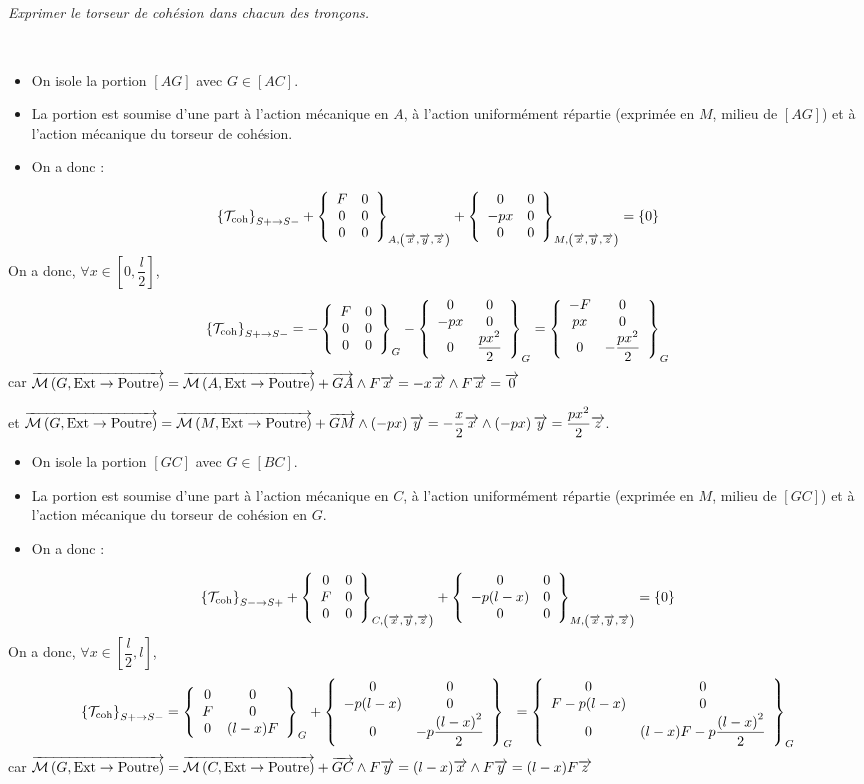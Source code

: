 \documentclass[10pt,fleqn]{article} %
\begin{document}
\begin{multicols}{2}
\subparagraph{}
\textit{Exprimer le torseur de cohésion dans chacun des tronçons.}
\ifprof
\begin{corrige}
~\\
\begin{itemize}[label=,font=\color{ocre}] 
\item On isole la portion $[AG]$ avec $G \in [AC]$.
\item La portion est soumise d'une part à l'action mécanique en $A$, à l'action uniformément répartie (exprimée en $M$, milieu de $[AG]$) et à l'action mécanique du torseur de cohésion.
\item On a donc : 
\end{itemize}
$$
\torseurscoh_{S+\rightarrow S-} +
 \torseurcol{F}{0}{0}{0}{0}{0}{A,\left( \vect{x},\vect{y},\vect{z} \right)} 
 +\torseurcol{0}{-px}{0}{0}{0}{0}{M,\left( \vect{x},\vect{y},\vect{z} \right)} 
 = \{0\}
$$
On a donc, $\forall x \in \left[0,\dfrac{l}{2}\right]$, 
$$
\torseurscoh_{S+\rightarrow S-}
=-\torseurcol{F}{0}{0}{0}{0}{0}{G}
-\torseurcol{0}{-px}{0}{0}{0}{ \dfrac{px^2}{2}}{G}
=\torseurcol{-F}{px}{0}{0}{0}{-\dfrac{px^2}{2}}{G}
$$
car 
$\vectm{G}{\text{Ext}}{\text{Poutre}}
=\vectm{A}{\text{Ext}}{\text{Poutre}} + \vect{GA}\wedge F \vect{x}  
=  -x\vect{x}  \wedge F \vect{x}
=  \vect{0}
$ 

et 
$\vectm{G}{\text{Ext}}{\text{Poutre}}
=\vectm{M}{\text{Ext}}{\text{Poutre}} + \vect{GM}\wedge \left( -px \right) \vect{y}  
= -\dfrac{x}{2}\vect{x}\wedge \left( -px\right) \vect{y}  
=   \dfrac{px^2}{2} \vect{z}  
$.

\begin{itemize}[label=,font=\color{ocre}] 
\item On isole la portion $[GC]$ avec $G\in [BC]$.
\item La portion est soumise d'une part à l'action mécanique en $C$, à l'action uniformément répartie (exprimée en $M$, milieu de $[GC]$) et à l'action mécanique du torseur de cohésion en $G$.
\item On a donc : 
\end{itemize}
$$
\torseurscoh_{S-\rightarrow S+} +
 \torseurcol{0}{F}{0}{0}{0}{0}{C,\left( \vect{x},\vect{y},\vect{z} \right)} 
 +\torseurcol{0}{-p(l-x)}{0}{0}{0}{0}{M,\left( \vect{x},\vect{y},\vect{z} \right)} 
 = \{0\}
$$
On a donc, $\forall x \in \left[\dfrac{l}{2},l\right]$, 
$$
\torseurscoh_{S+\rightarrow S-}
= \torseurcol{0}{F}{0}{0}{0}{(l-x)F}{G} 
 +\torseurcol{0}{-p(l-x)}{0}{0}{0}{-p\dfrac{\left(l-x\right)^2}{2}}{G} 
 = \torseurcol{0}{F-p(l-x)}{0}{0}{0}{(l-x)F-p\dfrac{\left(l-x\right)^2}{2}}{G} 
$$
car 
$\vectm{G}{\text{Ext}}{\text{Poutre}}
=\vectm{C}{\text{Ext}}{\text{Poutre}} + \vect{GC}\wedge F \vect{y}  
=  (l-x)\vect{x}  \wedge F \vect{y}
=  (l-x)F\vect{z}
$ 


\end{corrige}
\end{multicols}
\end{document}
